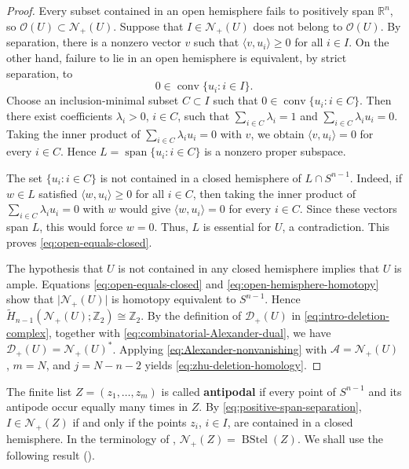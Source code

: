 \documentclass[12pt,reqno]{amsart}
\numberwithin{equation}{section}
\theoremstyle{remark}
\DeclareMathOperator{\spanop}{span}
\newcommand{\R}{\mathbb R}
\newcommand{\Ncal}{\mathcal N}
\newcommand{\Dcal}{\mathcal D}
\begin{document}
\begin{proof}
Every subset contained in an open hemisphere fails to positively span $\R^n$, so $\mathcal O(U)\subset\Ncal_+(U)$. Suppose that $I\in\Ncal_+(U)$ does not belong to $\mathcal O(U)$. By separation, there is a nonzero vector $v$ such that $\langle v,u_i\rangle\geq0$ for all $i\in I$. On the other hand, failure to lie in an open hemisphere is equivalent, by strict separation, to
\[
 0\in\operatorname{conv}\{u_i:i\in I\}.
\]
Choose an inclusion-minimal subset \(C\subset I\) such that
\(0\in\operatorname{conv}\{u_i:i\in C\}\). Then there exist coefficients
\(\lambda_i>0\), \(i\in C\), such that
\(\sum_{i\in C}\lambda_i=1\) and
\(\sum_{i\in C}\lambda_i u_i=0\). Taking the inner product of \(\sum_{i\in C}\lambda_i u_i=0\) with
\(v\),  we obtain
\(\langle v,u_i\rangle=0\) for every \(i\in C\). Hence $L=\spanop\{u_i:i\in C\}$ is a nonzero proper subspace.

The set $\{u_i:i\in C\}$ is not contained in a closed hemisphere of $L\cap S^{n-1}$. Indeed, if $w\in L$ satisfied $\langle w,u_i\rangle\geq0$ for all $i\in C$, then  taking the
inner product of \(\sum_{i\in C}\lambda_i u_i=0\) with \(w\) would give $\langle w,u_i\rangle=0$ for every $i\in C$. Since these vectors span $L$, this would force $w=0$. Thus, $L$ is essential for $U$, a contradiction. This proves \eqref{eq:open-equals-closed}.

The hypothesis that $U$ is not contained in any closed hemisphere implies that $U$ is ample. Equations \eqref{eq:open-equals-closed} and
\eqref{eq:open-hemisphere-homotopy} show that
\(\lvert\Ncal_+(U)\rvert\) is homotopy equivalent to \(S^{n-1}\).
Hence
\(\widetilde H_{n-1}(\Ncal_+(U);\mathbb Z_2)\cong\mathbb Z_2\).  By the definition of \(\Dcal_+(U)\) in
\eqref{eq:intro-deletion-complex}, together with
\eqref{eq:combinatorial-Alexander-dual}, we have
\(\Dcal_+(U)=\Ncal_+(U)^*\). Applying
\eqref{eq:Alexander-nonvanishing} with
\(\mathcal A=\Ncal_+(U)\), \(m=N\), and \(j=N-n-2\) yields
\eqref{eq:zhu-deletion-homology}. 
\end{proof}

The finite list \(Z=(z_1,\ldots,z_m)\) is called
\textbf{antipodal} if every point of \(S^{n-1}\) and its antipode
occur equally many times in \(Z\). By
\eqref{eq:positive-span-separation}, \(I\in\Ncal_+(Z)\) if and only if
the points \(z_i\), \(i\in I\), are contained in a closed hemisphere.
In the terminology of \cite{AyzenbergBeketovMagai},
\(\Ncal_+(Z)=\operatorname{BStel}(Z)\).
 We shall use the following result
\textup{(\cite[Theorem~2 and Corollary~2.10]{AyzenbergBeketovMagai})}.
\end{document}
